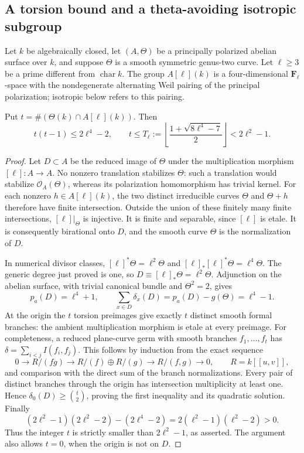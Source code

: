\subsection{A torsion bound and a theta-avoiding isotropic subgroup}

Let \(k\) be algebraically closed, let \((A,\Theta)\) be a
principally polarized abelian surface over \(k\), and suppose
\(\Theta\) is a smooth symmetric genus-two curve. Let
\(\ell\ge3\) be a prime different from \(\operatorname{char}k\).
The group \(A[\ell](k)\) is a four-dimensional
\(\mathbf F_\ell\)-space with the nondegenerate alternating
Weil pairing of the principal polarization; isotropic below
refers to this pairing.

\begin{lemma}
\label{lem:root-theta-torsion-delta-bound}
Put \(t=\#(\Theta(k)\cap A[\ell](k))\). Then
\[
 t(t-1)\le2\ell^4-2,\qquad
 t\le T_\ell:={\left\lfloor
             \frac{1+\sqrt{8\ell^4-7}}2\right\rfloor}
       <2\ell^2-1.
\]
\end{lemma}
\begin{proof}
Let \(D\subset A\) be the reduced image of \(\Theta\)
under the multiplication morphism \([\ell]:A\to A\).
No nonzero translation stabilizes \(\Theta\): such a
translation would stabilize \(\mathcal O_A(\Theta)\),
whereas its polarization homomorphism has trivial kernel.
For each nonzero \(h\in A[\ell](k)\), the two distinct
irreducible curves \(\Theta\) and \(\Theta+h\) therefore
have finite intersection. Outside the union of these finitely
many finite intersections, \([\ell]|_\Theta\) is injective.
It is finite and separable, since \([\ell]\) is etale.
It is consequently birational onto \(D\), and the smooth
curve \(\Theta\) is the normalization of \(D\).

In numerical divisor classes, \([\ell]^*\Theta=\ell^2\Theta\)
and \([\ell]_*[\ell]^*\Theta=\ell^4\Theta\). The
generic degree just proved is one, so
\(D\equiv[\ell]_*\Theta=\ell^2\Theta\).
Adjunction on the abelian surface, with trivial canonical
bundle and \(\Theta^2=2\), gives
\[
 p_a(D)=\ell^4+1,\qquad
 \sum_{x\in D}\delta_x(D)=p_a(D)-g(\Theta)=\ell^4-1.
\]
At the origin the \(t\) torsion preimages give exactly
\(t\) distinct smooth formal branches: the ambient
multiplication morphism is etale at every preimage.
For completeness, a reduced plane-curve germ with smooth
branches \(f_1,\ldots,f_t\) has
\(\delta=\sum_{i<j}I(f_i,f_j)\).
This follows by induction from the exact sequence
\[
0\longrightarrow R/(fg)\longrightarrow
 R/(f)\oplus R/(g)\longrightarrow R/(f,g)\longrightarrow0,
 \qquad R=k[[u,v]],
\]
and comparison with the direct sum of the branch
normalizations. Every pair of distinct branches through
the origin has intersection multiplicity at least one.
Hence \(\delta_0(D)\ge\binom t2\), proving the first
inequality and its quadratic solution. Finally
\[
(2\ell^2-1)(2\ell^2-2)-(2\ell^4-2)
 =2(\ell^2-1)(\ell^2-2)>0.
\]
Thus the integer \(t\) is strictly smaller than
\(2\ell^2-1\), as asserted. The argument also allows
\(t=0\), when the origin is not on \(D\).
\end{proof}

